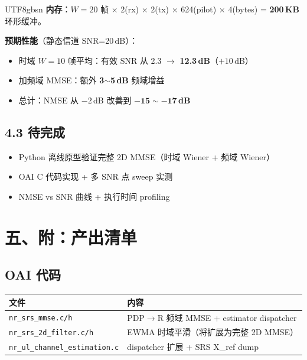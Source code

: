 \documentclass[11pt,a4paper]{article}
\begin{document}
\begin{CJK}{UTF8}{gbsn}
\textbf{内存}：$W=20$ 帧 $\times$ 2(rx) $\times$ 2(tx) $\times$ 624(pilot) $\times$ 4(bytes) = \textbf{200\,KB} 环形缓冲。

\textbf{预期性能}（静态信道 SNR=20\,dB）：

\begin{itemize}[leftmargin=2em]
\item 时域 $W=10$ 帧平均：有效 SNR 从 2.3 $\to$ \textbf{12.3\,dB}（$+10$\,dB）
\item 加频域 MMSE：额外 \textbf{3$\sim$5\,dB} 频域增益
\item 总计：NMSE 从 $-2$\,dB 改善到 $\mathbf{-15 \sim -17}$\,\textbf{dB}
\end{itemize}

\subsection{4.3 待完成}

\begin{itemize}[leftmargin=2em]
\item Python 离线原型验证完整 2D MMSE（时域 Wiener + 频域 Wiener）
\item OAI C 代码实现 + 多 SNR 点 sweep 实测
\item NMSE vs SNR 曲线 + 执行时间 profiling
\end{itemize}

\section{五、附：产出清单}

\subsection{OAI 代码}

\begin{table}[h]\centering
\begin{tabular}{ll}
\toprule
文件 & 内容 \\
\midrule
\texttt{nr\_srs\_mmse.c/h} & PDP$\to$R 频域 MMSE + estimator dispatcher \\
\texttt{nr\_srs\_2d\_filter.c/h} & EWMA 时域平滑（将扩展为完整 2D MMSE） \\
\texttt{nr\_ul\_channel\_estimation.c} & dispatcher 扩展 + SRS X\_ref dump \\
\bottomrule
\end{tabular}
\end{table}


\end{CJK}
\end{document}
